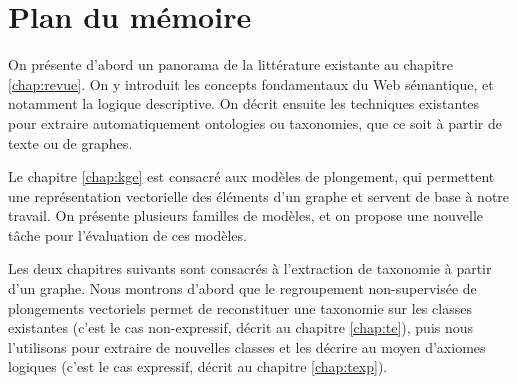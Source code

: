 \section{Plan du mémoire}  %



On présente d'abord un panorama de la littérature existante au chapitre \ref{chap:revue}. On y introduit les concepts fondamentaux du Web sémantique, et notamment la logique descriptive. On décrit ensuite les techniques existantes pour extraire automatiquement ontologies ou taxonomies, que ce soit à partir de texte ou de graphes.

Le chapitre \ref{chap:kge} est consacré aux modèles de plongement, qui permettent une représentation vectorielle des éléments d'un graphe et servent de base à notre travail. On présente plusieurs familles de modèles, et on propose une nouvelle tâche pour l'évaluation de ces modèles.





Les deux chapitres suivants sont consacrés à l'extraction de taxonomie à partir d'un graphe. Nous montrons d'abord que le regroupement non-supervisée de plongements vectoriels permet de reconstituer une taxonomie sur les classes existantes (c'est le cas non-expressif, décrit au chapitre \ref{chap:te}), puis nous l'utilisons pour extraire de nouvelles classes et les décrire au moyen d'axiomes logiques (c'est le cas expressif, décrit au chapitre \ref{chap:texp}).


\clearpage